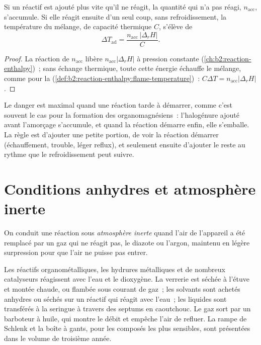 \begin{proposition}[Accumulation]\label{prop:b2:lab-techniques-2:accumulation}
Si un réactif est ajouté plus vite qu'il ne réagit, la quantité qui n'a pas réagi, $n_{\mathrm{acc}}$,
s'accumule. Si elle réagit ensuite d'un seul coup, sans refroidissement, la température du mélange, de
capacité thermique $C$, s'élève de
\begin{equation*}
\Delta T_{\mathrm{ad}} = \frac{n_{\mathrm{acc}}\,|\Delta_rH|}{C}.
\end{equation*}
\end{proposition}

\begin{proof}
La réaction de $n_{\mathrm{acc}}$ libère $n_{\mathrm{acc}}|\Delta_rH|$ à pression constante
(\cref{ch:b2:reaction-enthalpy})~; sans échange thermique, toute cette énergie échauffe le mélange, comme
pour la  (\cref{def:b2:reaction-enthalpy:flame-temperature})~: $C\Delta T =
n_{\mathrm{acc}}|\Delta_rH|$.
\end{proof}

Le danger est maximal quand une réaction tarde à démarrer, comme c'est souvent le cas pour la formation
des organomagnésiens~: l'halogénure ajouté avant l'amorçage s'accumule, et quand la réaction démarre
enfin, elle s'emballe. La règle est d'ajouter une petite portion, de voir la réaction démarrer
(échauffement, trouble, léger reflux), et seulement ensuite d'ajouter le reste au rythme que le
refroidissement peut suivre.

\section{Conditions anhydres et atmosphère inerte}

\begin{definition}\label{def:b2:lab-techniques-2:inert}
On conduit une réaction sous \emph{atmosphère inerte} quand
l'air de l'appareil a été remplacé par un gaz qui ne réagit pas, le diazote ou l'argon, maintenu en
légère surpression pour que l'air ne puisse pas entrer.
\end{definition}

Les réactifs organométalliques, les hydrures métalliques et de nombreux catalyseurs réagissent avec
l'eau et le dioxygène. La verrerie est séchée à l'étuve et montée chaude, ou flambée sous courant de
gaz~; les solvants sont achetés anhydres ou séchés sur un réactif qui réagit avec l'eau~; les liquides
sont transférés à la seringue à travers des septums en caoutchouc. Le gaz sort par un barboteur à huile,
qui montre le débit et empêche l'air de refluer. La rampe de Schlenk et la boîte à gants, pour les
composés les plus sensibles, sont présentées dans le volume de troisième année.

